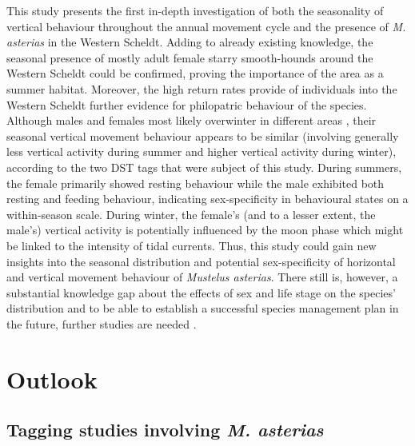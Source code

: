 \documentclass[
  authoryear,
  review,
  3p]{elsarticle}
\begin{document}
This study presents the first in-depth investigation of both the
seasonality of vertical behaviour throughout the annual movement cycle
and the presence of \emph{M. asterias} in the Western Scheldt. Adding to
already existing knowledge, the seasonal presence of mostly adult female
starry smooth-hounds around the Western Scheldt could be confirmed,
proving the importance of the area as a summer habitat. Moreover, the
high return rates provide of individuals into the Western Scheldt
further evidence for philopatric behaviour of the species. Although
males and females most likely overwinter in different areas
\citep{breve_2016, griffiths_2020}, their seasonal vertical movement
behaviour appears to be similar (involving generally less vertical
activity during summer and higher vertical activity during winter),
according to the two DST tags that were subject of this study. During
summers, the female primarily showed resting behaviour while the male
exhibited both resting and feeding behaviour, indicating sex-specificity
in behavioural states on a within-season scale. During winter, the
female's (and to a lesser extent, the male's) vertical activity is
potentially influenced by the moon phase which might be linked to the
intensity of tidal currents. Thus, this study could gain new insights
into the seasonal distribution and potential sex-specificity of
horizontal and vertical movement behaviour of \emph{Mustelus asterias}.
There still is, however, a substantial knowledge gap about the effects
of sex and life stage on the species' distribution
\citep{griffiths_2020} and to be able to establish a successful species
management plan in the future, further studies are needed
\citep{mccullyphillips_2015, breve_2016, breve_2020, griffiths_2020}.

\hypertarget{outlook}{%
\section{Outlook}\label{outlook}}

\hypertarget{tagging-studies-involving-m.-asterias}{%
\subsection{\texorpdfstring{Tagging studies involving \emph{M.
asterias}}{Tagging studies involving M. asterias}}\label{tagging-studies-involving-m.-asterias}}
\end{document}
